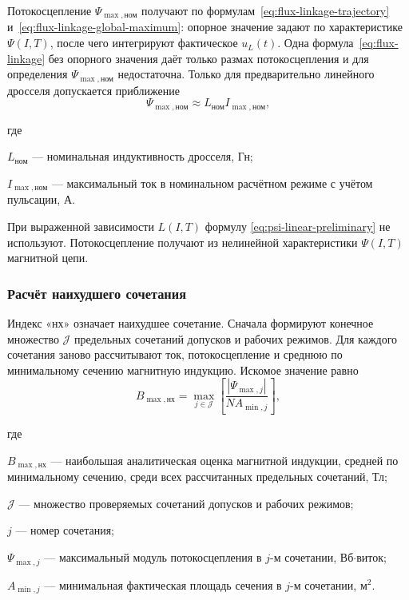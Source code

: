 \documentclass[14pt,a4paper]{extarticle}
\newenvironment{whereblock}
 {\par\noindent где\par
  \begin{list}{}{\setlength{\leftmargin}{12.5mm}
                  \setlength{\itemindent}{-12.5mm}
                  \setlength{\itemsep}{0pt}
                  \setlength{\parsep}{0pt}
                  \setlength{\topsep}{0pt}}}
 {\end{list}}
\newcommand{\whereitem}[2]{\item[] #1 --- #2}
\begin{document}
Потокосцепление $\Psi_{\max,\text{ном}}$ получают по
формулам~\eqref{eq:flux-linkage-trajectory}
и~\eqref{eq:flux-linkage-global-maximum}: опорное значение задают по
характеристике $\Psi(I,T)$, после чего интегрируют фактическое $u_L(t)$.
Одна формула~\eqref{eq:flux-linkage} без опорного значения даёт только
размах потокосцепления и для определения $\Psi_{\max,\text{ном}}$
недостаточна. Только для предварительно линейного дросселя допускается
приближение
\begin{equation}
 \Psi_{\max,\text{ном}}\approx
 L_{\text{ном}} I_{\max,\text{ном}},
 \label{eq:psi-linear-preliminary}
\end{equation}
\begin{whereblock}
\whereitem{$L_{\text{ном}}$}{номинальная индуктивность дросселя, Гн;}
\whereitem{$I_{\max,\text{ном}}$}{максимальный ток в номинальном
расчётном режиме с учётом пульсации, А.}
\end{whereblock}

При выраженной зависимости $L(I,T)$ формулу
\eqref{eq:psi-linear-preliminary} не используют. Потокосцепление получают
из нелинейной характеристики $\Psi(I,T)$ магнитной цепи.

\subsubsection{Расчёт наихудшего сочетания}

Индекс «нх» означает наихудшее сочетание. Сначала формируют конечное
множество $\mathcal J$ предельных сочетаний допусков и рабочих режимов.
Для каждого сочетания заново рассчитывают ток, потокосцепление и среднюю
по минимальному сечению магнитную индукцию. Искомое значение равно
\begin{equation}
 B_{\max,\text{нх}}=
 \max_{j\in\mathcal J}
 \left[
 \frac{
 \left|\Psi_{\max,j}\right|
 }{
 N A_{\min,j}
 }
 \right],
 \label{eq:bmax-worst-case}
\end{equation}
\begin{whereblock}
\whereitem{$B_{\max,\text{нх}}$}{наибольшая аналитическая оценка магнитной
индукции, средней по минимальному сечению, среди всех рассчитанных
предельных сочетаний, Тл;}
\whereitem{$\mathcal J$}{множество проверяемых сочетаний допусков и
рабочих режимов;}
\whereitem{$j$}{номер сочетания;}
\whereitem{$\Psi_{\max,j}$}{максимальный модуль потокосцепления в
$j$-м сочетании, Вб$\cdot$виток;}
\whereitem{$A_{\min,j}$}{минимальная фактическая площадь сечения в
$j$-м сочетании, м$^2$.}
\end{whereblock}
\end{document}
